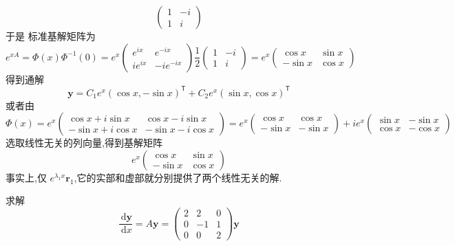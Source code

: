 \documentclass[lang=cn,12pt,color=green,fontset=none]{elegantbook}
\begin{document}
\begin{solution}
$$\begin{pmatrix}
        1& -i\\ 
          1& i 
    \end{pmatrix}  
    $$ 于是 标准基解矩阵为 $$
    e^{xA}= \Phi \left( x \right)\Phi ^{-1} \left( 0 \right) = e^{x}\begin{pmatrix} 
        e^{ix}& e^{-ix}\\ 
         i e^{ix}& -ie^{-ix} 
    \end{pmatrix} \frac{1}{2} \begin{pmatrix} 
         1& -i\\ 
          1& i 
    \end{pmatrix} = e^{x} \begin{pmatrix} 
       \cos x& \sin x\\ 
        -\sin x & \cos x   
    \end{pmatrix}     
    $$得到通解 $$
    \mathbf{y}=C_1 e^{x}\left( \cos x,-\sin x \right)^{\mathsf{T}}+ C_2 e^{x}\left( \sin x,\cos x \right)^{\mathsf{T}}  
    $$  或者由 $$
    \Phi \left( x \right) =  e^{x } \begin{pmatrix} 
        \cos x + i\sin x& \cos x-i\sin x\\ 
         -\sin x+ i\cos x& -\sin x-i\cos x 
    \end{pmatrix} = e^{x}\begin{pmatrix} 
        \cos x& \cos x\\ 
         -\sin x &-\sin x
    \end{pmatrix} + ie^{x}\begin{pmatrix} 
        \sin x&-\sin x\\ 
         \cos x& -\cos x 
    \end{pmatrix}  
    $$选取线性无关的列向量,得到基解矩阵 $$
    e^{x}\begin{pmatrix} 
        \cos x& \sin x\\ 
         -\sin x&\cos x 
    \end{pmatrix} 
    $$事实上,仅 $ e^{ \lambda _{1}x}\mathbf{r}_{1} $,它的实部和虚部就分别提供了两个线性无关的解. 
 \end{solution}
\begin{example}
    求解 $$
    \frac{\,\mathrm{d} \mathbf{y} }{\,\mathrm{d} x }= A \mathbf{y}= \begin{pmatrix} 
        2& 2& 0\\ 
         0& -1& 1\\ 
          0& 0& 2 
    \end{pmatrix} \mathbf{y}  
    $$
\end{example}
\end{document}
